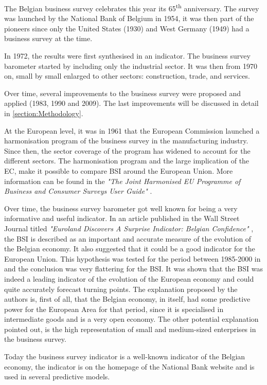 \documentclass[12pt,a4paper,oneside]{book}
\begin{document}
The Belgian business survey celebrates this year its 65\textsuperscript{th} anniversary. The survey was launched by the National Bank of Belgium in 1954, it was then part of the pioneers since only the United States (1930) and West Germany (1949) had a business survey at the time.

In 1972, the results were first synthesised in an indicator.
The business survey barometer started by including only the industrial sector. It was then from 1970 on, small by small enlarged to other sectors: construction, trade, and services. 

Over time, several improvements to the business survey were proposed and applied (1983, 1990 and 2009). The last improvements will be discussed in detail in \autoref{section:Methodology}.

At the European level, it was in 1961 that the European Commission launched a harmonisation program of the business survey in the manufacturing industry. 
Since then, the sector coverage of the program has widened to account for the different sectors.
The harmonisation program and the large implication of the EC, make it possible to compare BSI around the European Union.
More information can be found in the \textit{"The Joint Harmonised EU Programme of Business and Consumer Surveys User Guide"} \cite{european_commission_joint_2016}.

Over time, the business survey barometer got well known for being a very informative and useful indicator. 
In an article published in the Wall Street Journal titled \textit{"Euroland Discovers A Surprise Indicator: Belgian Confidence"} \citep{rhoads_euroland_1999}, the BSI is described as an important and accurate measure of the evolution of the Belgian economy. 
It also suggested that it could be a good indicator for the European Union. 
This hypothesis was tested for the period between 1985-2000 in \cite{vanhaelen_belgian_2000} and the conclusion was very flattering for the BSI. 
It was shown that the BSI was indeed a leading indicator of the evolution of the European economy and could quite accurately forecast turning points. 
The explanation proposed by the authors is, first of all, that the Belgian economy, in itself, had some predictive power for the European Area for that period, since it is specialised in intermediate goods and is a very open economy. 
The other potential explanation pointed out, is the high representation of small and medium-sized enterprises in the business survey.

Today the business survey indicator is a well-known indicator of the Belgian economy, the indicator is on the homepage of the National Bank website and is used in several predictive models.
\end{document}
